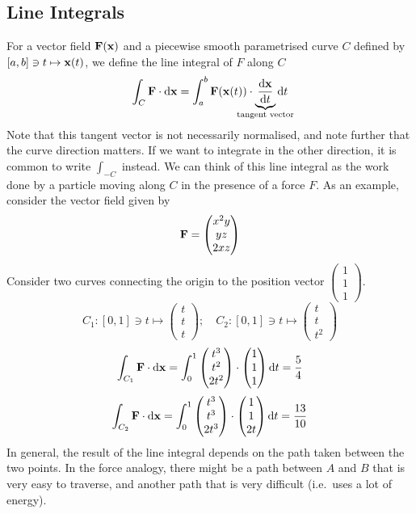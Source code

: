 \subsection{Line Integrals}
For a vector field \(\vb F(\vb x)\) and a piecewise smooth parametrised curve \(C\) defined by \([a, b] \ni t \mapsto \vb x(t)\), we define the line integral of \(F\) along \(C\)
\[
	\int_C \vb F \cdot \dd \vb x = \int_a^b \vb F(\vb x(t)) \cdot \underbrace{\frac{\dd \vb x}{\dd{t}}}_{\mathclap{\text{tangent vector}}} \dd{t}
\]
Note that this tangent vector is not necessarily normalised, and note further that the curve direction matters.
If we want to integrate in the other direction, it is common to write \(\int_{-C}\) instead.
We can think of this line integral as the work done by a particle moving along \(C\) in the presence of a force \(F\).
As an example, consider the vector field given by
\[
	\vb F = \begin{pmatrix}
		x^2 y \\ yz \\ 2xz
	\end{pmatrix}
\]
Consider two curves connecting the origin to the position vector \(\begin{pmatrix}
	1 \\ 1 \\ 1
\end{pmatrix}\).
\[
	C_1 \colon [0, 1] \ni t \mapsto \begin{pmatrix}
		t \\ t \\ t
	\end{pmatrix};\quad C_2 \colon [0, 1] \ni t \mapsto \begin{pmatrix}
		t \\ t \\ t^2
	\end{pmatrix}
\]
\[
	\int_{C_1}\vb F \cdot \dd \vb x = \int_0^1 \begin{pmatrix}
		t^3 \\ t^2 \\ 2t^2
	\end{pmatrix} \cdot \begin{pmatrix}
		1 \\ 1 \\ 1
	\end{pmatrix} \dd{t} = \frac{5}{4}
\]
\[
	\int_{C_2}\vb F \cdot \dd \vb x = \int_0^1 \begin{pmatrix}
		t^3 \\ t^3 \\ 2t^3
	\end{pmatrix} \cdot \begin{pmatrix}
		1 \\ 1 \\ 2t
	\end{pmatrix} \dd{t} = \frac{13}{10}
\]
In general, the result of the line integral depends on the path taken between the two points.
In the force analogy, there might be a path between \(A\) and \(B\) that is very easy to traverse, and another path that is very difficult (i.e.\ uses a lot of energy).

